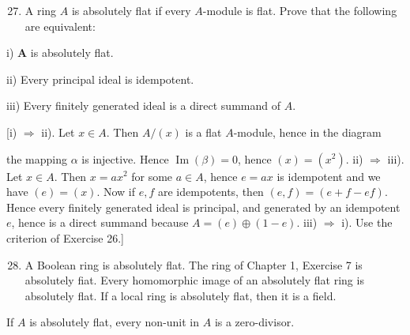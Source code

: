 \documentclass{standalone}
\theoremstyle{definition}
\theoremstyle{remark}
\begin{document}
\begin{enumerate}
  \setcounter{enumi}{26}
  \item A ring $A$ is absolutely flat if every $A$-module is flat. Prove that the following are equivalent:
\end{enumerate}

i) $\boldsymbol{A}$ is absolutely flat.

ii) Every principal ideal is idempotent.

iii) Every finitely generated ideal is a direct summand of $A$.

[i) $\Rightarrow$ ii). Let $x \in A$. Then $A /(x)$ is a flat $A$-module, hence in the diagram

\begin{center}
\end{center}

the mapping $\alpha$ is injective. Hence $\operatorname{Im}(\beta)=0$, hence $(x)=\left(x^{2}\right)$. ii) $\Rightarrow$ iii). Let $x \in A$. Then $x=a x^{2}$ for some $a \in A$, hence $e=a x$ is idempotent and we have $(e)=(x)$. Now if $e, f$ are idempotents, then $(e, f)=(e+f-e f)$. Hence every finitely generated ideal is principal, and generated by an idempotent $e$, hence is a direct summand because $A=(e) \oplus(1-e)$. iii) $\Rightarrow$ i). Use the criterion of Exercise 26.]

\begin{enumerate}
  \setcounter{enumi}{27}
  \item A Boolean ring is absolutely flat. The ring of Chapter 1, Exercise 7 is absolutely fiat. Every homomorphic image of an absolutely flat ring is absolutely flat. If a local ring is absolutely flat, then it is a field.
\end{enumerate}

If $A$ is absolutely flat, every non-unit in $A$ is a zero-divisor.
\end{document}
